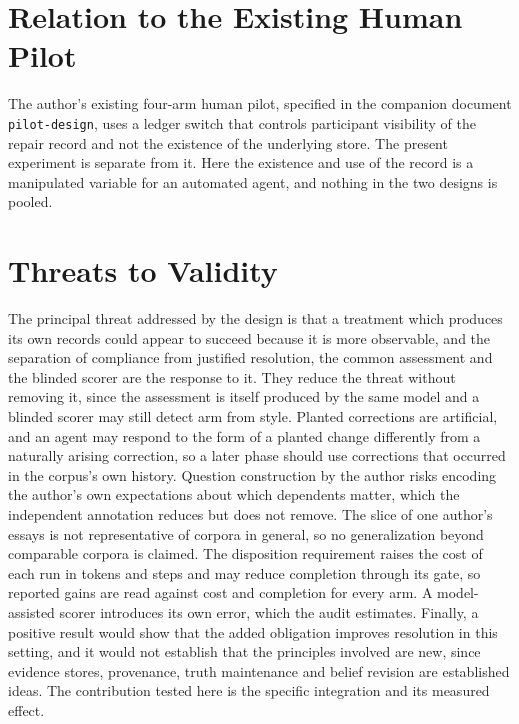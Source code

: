 \documentclass[11pt]{article}
\begin{document}
\section{Relation to the Existing Human Pilot}\label{sec:pilot}

The author's existing four-arm human pilot, specified in the companion document \texttt{pilot-design}, uses a ledger switch that controls participant visibility of the repair record and not the existence of the underlying store. The present experiment is separate from it. Here the existence and use of the record is a manipulated variable for an automated agent, and nothing in the two designs is pooled.

\section{Threats to Validity}\label{sec:threats}

The principal threat addressed by the design is that a treatment which produces its own records could appear to succeed because it is more observable, and the separation of compliance from justified resolution, the common assessment and the blinded scorer are the response to it. They reduce the threat without removing it, since the assessment is itself produced by the same model and a blinded scorer may still detect arm from style. Planted corrections are artificial, and an agent may respond to the form of a planted change differently from a naturally arising correction, so a later phase should use corrections that occurred in the corpus's own history. Question construction by the author risks encoding the author's own expectations about which dependents matter, which the independent annotation reduces but does not remove. The slice of one author's essays is not representative of corpora in general, so no generalization beyond comparable corpora is claimed. The disposition requirement raises the cost of each run in tokens and steps and may reduce completion through its gate, so reported gains are read against cost and completion for every arm. A model-assisted scorer introduces its own error, which the audit estimates. Finally, a positive result would show that the added obligation improves resolution in this setting, and it would not establish that the principles involved are new, since evidence stores, provenance, truth maintenance \cite{doyle1979tms,dekleer1986atms} and belief revision are established ideas. The contribution tested here is the specific integration and its measured effect.
\end{document}
